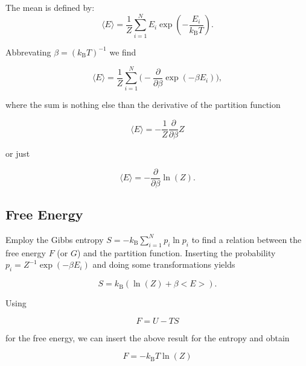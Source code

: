 \documentclass[letterpaper,10pt,english]{sphinxmanual}
\begin{document}
\sphinxAtStartPar
The mean is defined by: \begin{equation}
\langle E \rangle=\frac{1}{Z}\sum_{i=1}^{N}E_{i}\exp\left ( -\frac{E_i}{k_\mathrm{B} T}\right).
\end{equation}

\sphinxAtStartPar
Abbrevating \(\beta=(k_\mathrm{B} T)^{-1}\) we find

\sphinxAtStartPar
\begin{equation}
\langle E \rangle=\frac{1}{Z}\sum_{i=1}^{N}\bigg(- \frac{\partial }{\partial \beta}\exp\left ( -\beta E_i\right)\bigg),
\end{equation}

\sphinxAtStartPar
where the sum is nothing else than the derivative of the partition function

\sphinxAtStartPar
\begin{equation}
\langle E \rangle=-\frac{1}{Z} \frac{\partial }{\partial \beta}Z
\end{equation}

\sphinxAtStartPar
or just

\sphinxAtStartPar
\begin{equation}
\langle E \rangle=-\frac{\partial }{\partial \beta}\ln(Z).
\end{equation}


\subsection{Free Energy}
\label{\detokenize{notebooks/L2/3_Statistical_Physics_Definitions:Free-Energy}}
\sphinxAtStartPar
Employ the Gibbs entropy \(S=-k_\mathrm{B}\sum_{i=1}^{N} p_{i} \ln p_{i}\) to find a relation between the free energy \(F\) (or \(G\)) and the partition function. Inserting the probability \(p_i=Z^{-1}\exp(-\beta E_i)\) and doing some transformations yields

\sphinxAtStartPar
\begin{equation}
S=k_\mathrm{B} (\ln(Z)+\beta <E>).
\end{equation}

\sphinxAtStartPar
Using

\sphinxAtStartPar
\begin{equation}
F=U-TS
\end{equation}

\sphinxAtStartPar
for the free energy, we can insert the above result for the entropy and obtain

\sphinxAtStartPar
\begin{equation}
F=-k_\mathrm{B} T \ln(Z)
\end{equation}
\end{document}

